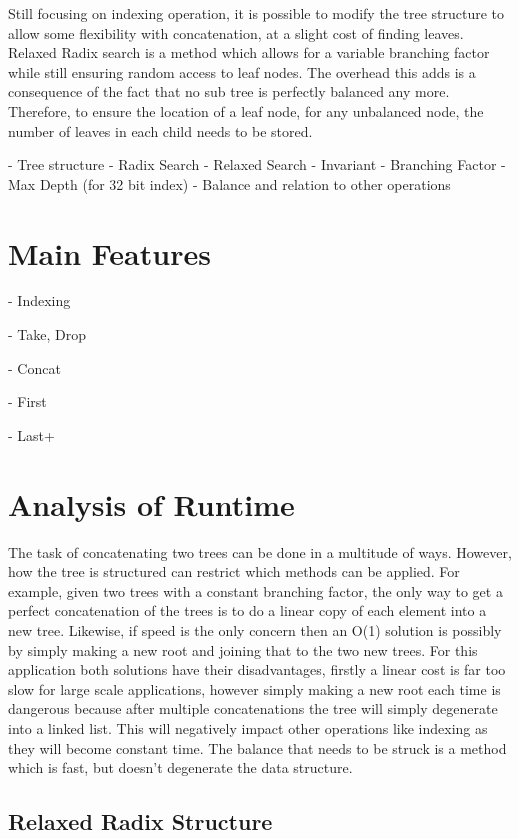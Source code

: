 \documentclass[11pt,a4paper,oneside]{article}
\begin{document}
Still focusing on indexing operation, it is possible to modify the tree structure to allow some flexibility with concatenation, at a slight cost of finding leaves. Relaxed Radix search is a method which allows for a variable branching factor while still ensuring random access to leaf nodes. The overhead this adds is a consequence of the fact that no sub tree is perfectly balanced any more. Therefore, to ensure the location of a leaf node, for any unbalanced node, the number of leaves in each child needs to be stored.



- Tree structure
- Radix Search
- Relaxed Search
- Invariant
- Branching Factor
- Max Depth (for 32 bit index)
- Balance and relation to other operations


\section{Main Features}

- Indexing

- Take, Drop

- Concat

- First

- Last+ 


\section{Analysis of Runtime}

The task of concatenating two trees can be done in a multitude of ways. However, how the tree is structured can restrict which methods can be applied. For example, given two trees with a constant branching factor, the only way to get a perfect concatenation of the trees is to do a linear copy of each element into a new tree. Likewise, if speed is the only concern then an O(1) solution is possibly by simply making a new root and joining that to the two new trees. For this application both solutions have their disadvantages, firstly a linear cost is far too slow for large scale applications, however simply making a new root each time is dangerous because after multiple concatenations the tree will simply degenerate into a linked list. This will negatively impact other operations like indexing as they will become constant time. The balance that needs to be struck is a method which is fast, but doesn't degenerate the data structure.

\subsection*{Relaxed Radix Structure}
\end{document}

